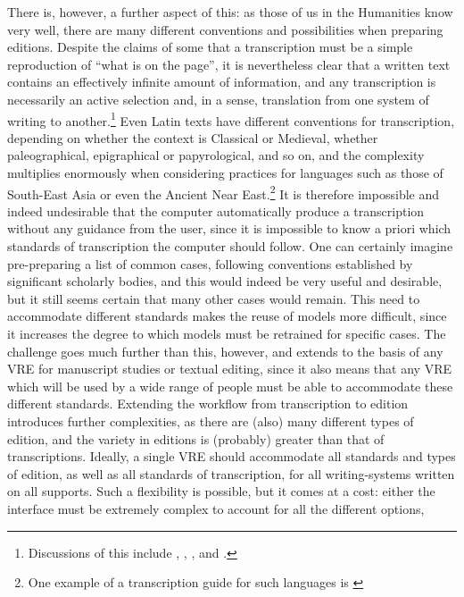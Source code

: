 There is, however, a further aspect of this: as those of us in the Humanities
know very well, there are many different conventions and possibilities when
preparing editions. Despite the claims of some that a transcription must be a
simple reproduction of “what is on the page”, it is nevertheless clear that a
written text contains an effectively infinite amount of information, and any
transcription is necessarily an active selection and, in a sense, translation
from one system of writing to another.\footnote{Discussions of this include
\cite[pg. 464-472]{pierazzo2011rationale}, \cite[pg.
85-101]{pierazzo2016digital},
\cite{huitfeldt2008transcription,sperberg2018interpreting}, and \cite[pg.
20-29]{robinson1993guidelines}.} Even Latin texts have different conventions
for transcription, depending on whether the context is Classical or Medieval,
whether paleographical,  epigraphical or papyrological, and so on, and the
complexity multiplies enormously when considering practices for languages such
as those of South-East Asia or even the Ancient Near East.\footnote{One example
of a transcription guide for such languages is \cite{balogh:halshs-02272407}}
It is therefore impossible and indeed undesirable that the computer
automatically produce a transcription without any guidance from the user, since
it is impossible to know a priori which standards of transcription the computer
should follow. One can certainly imagine pre-preparing a list of common cases,
following conventions established by significant scholarly bodies, and this
would indeed be very useful and desirable, but it still seems certain that many
other cases would remain. This need to accommodate different standards makes
the reuse of models more difficult, since it increases the degree to which
models must be retrained for specific cases. The challenge goes much further
than this, however, and extends to the basis of any VRE for manuscript studies
or textual editing, since it also means that any VRE which will be used by a
wide range of people must be able to accommodate these different standards.
Extending the workflow from transcription to edition introduces further
complexities, as there are (also) many different types of edition, and the
variety in editions is (probably) greater than that of transcriptions. Ideally,
a single VRE should accommodate all standards and types of edition, as well as
all standards of transcription, for all writing-systems written on all
supports. Such a flexibility is possible, but it comes at a cost: either the
interface must be extremely complex to account for all the different options,
